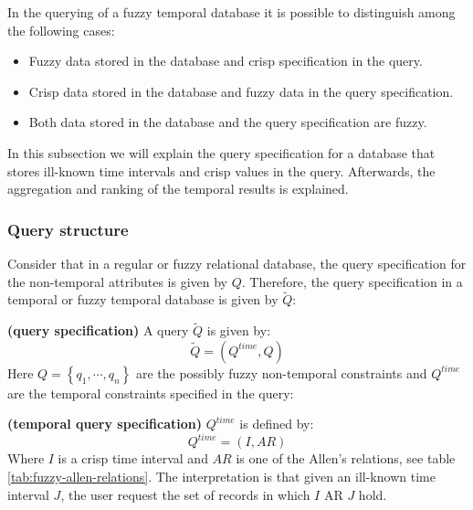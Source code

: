 In the querying of a fuzzy temporal database it is possible to distinguish among the following cases:

\begin{itemize}
\item
Fuzzy data stored in the database and crisp specification in the query.
\item
Crisp data stored in the database and fuzzy data in the query specification.
\item
Both data stored in the database and the query specification are fuzzy.
\end{itemize}
In this subsection we will explain the query specification for a database that stores ill-known time intervals and crisp values in the query. Afterwards, the aggregation and ranking of the temporal results is explained.

\subsubsection{Query structure}
Consider that in a regular or fuzzy relational database, the query specification for the non-temporal attributes is given by $Q$. Therefore, the query specification in a temporal or fuzzy temporal database is given by $\tilde{Q}$:

\begin{definition}
\textbf{(query specification)}
A query $\tilde{Q}$ is given by:
\begin{equation}
\label{eq:query-specification}
\tilde{Q} = \left( Q^{time}, Q \right)
\end{equation}
Here $Q = \left \lbrace q_1, \cdots, q_n \right \rbrace$ are the possibly fuzzy non-temporal constraints and $Q^{time}$ are the temporal constraints specified in the query:
\end{definition}



\begin{definition}
\textbf{(temporal query specification)}
$Q^{time}$ is defined by:
\begin{equation}
Q^{time} = \left( I,AR \right)
\end{equation}
Where $I$ is a crisp time interval and $AR$ is one of the Allen's relations, see table \ref{tab:fuzzy-allen-relations}. The interpretation is that given an ill-known time interval $J$, the user request the set of records in which $I$ AR $J$ hold.
\end{definition}

